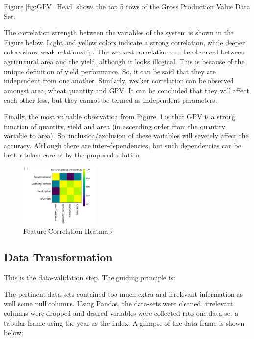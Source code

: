 Figure \ref{fig:GPV_Head} shows the top 5 rows of the Gross Production Value Data Set.


The correlation strength between the variables of the system is shown in the Figure below. Light and yellow colors indicate a strong correlation, while deeper colors show weak relationship. The weakest correlation can be observed between agricultural area and the yield, although it looks illogical. This is because of the unique definition of yield performance. So, it can be said that they are independent from one another. Similarly, weaker correlation can be observed amongst area, wheat quantity and GPV. It can be concluded that they will affect each other less, but they cannot be termed as independent parameters.  

Finally, the most valuable observation from Figure~\ref{fig:Corr} is that GPV is a strong function of quantity, yield and area (in ascending order from the quantity variable to area). So, inclusion/exclusion of these variables will severely affect the accuracy. Although there are inter-dependencies, but such dependencies can be better taken care of by the proposed solution.


\begin{figure}[h!]
	\centering
	\includegraphics[width=0.35\textwidth]{fig/correlation.png}
	\caption{Feature Correlation Heatmap}
	\label{fig:Corr}
\end{figure}


 




\subsection{Data Transformation} 

This is the data-validation step. The guiding principle is: 




The pertinent data-sets contained too much extra and irrelevant information as well some null columns. Using Pandas, the data-sets were cleaned, irrelevant columns were dropped and desired variables were collected into one data-set a tabular frame using the year as the index. A glimpse of the data-frame is shown below:



